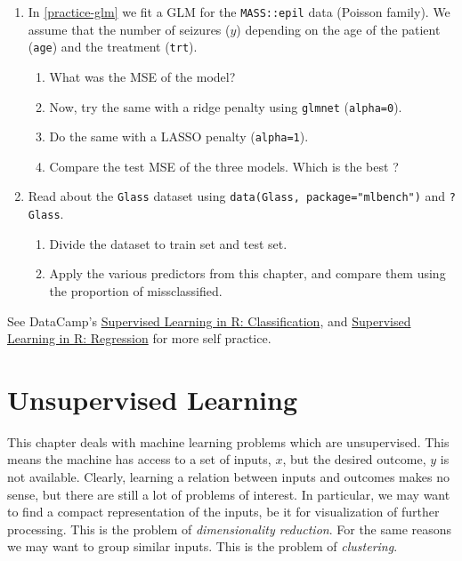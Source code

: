 \documentclass[]{book}
\providecommand{\tightlist}{%
  \setlength{\itemsep}{0pt}\setlength{\parskip}{0pt}}
\theoremstyle{definition}
\theoremstyle{definition}
\theoremstyle{definition}
\theoremstyle{remark}
\begin{document}
\begin{enumerate}
\def\labelenumi{\arabic{enumi}.}
\tightlist
\item
  In \ref{practice-glm} we fit a GLM for the \texttt{MASS::epil} data
  (Poisson family). We assume that the number of seizures (\(y\))
  depending on the age of the patient (\texttt{age}) and the treatment
  (\texttt{trt}).

  \begin{enumerate}
  \def\labelenumii{\arabic{enumii}.}
  \tightlist
  \item
    What was the MSE of the model?
  \item
    Now, try the same with a ridge penalty using \texttt{glmnet}
    (\texttt{alpha=0}).
  \item
    Do the same with a LASSO penalty (\texttt{alpha=1}).
  \item
    Compare the test MSE of the three models. Which is the best ?
  \end{enumerate}
\item
  Read about the \texttt{Glass} dataset using
  \texttt{data(Glass,\ package="mlbench")} and \texttt{?Glass}.

  \begin{enumerate}
  \def\labelenumii{\arabic{enumii}.}
  \tightlist
  \item
    Divide the dataset to train set and test set.
  \item
    Apply the various predictors from this chapter, and compare them
    using the proportion of missclassified.
  \end{enumerate}
\end{enumerate}

See DataCamp's
\href{https://www.datacamp.com/courses/supervised-learning-in-r-classification}{Supervised
Learning in R: Classification}, and
\href{https://www.datacamp.com/courses/supervised-learning-in-r-regression}{Supervised
Learning in R: Regression} for more self practice.

\chapter{Unsupervised Learning}\label{unsupervised}

This chapter deals with machine learning problems which are
unsupervised. This means the machine has access to a set of inputs,
\(x\), but the desired outcome, \(y\) is not available. Clearly,
learning a relation between inputs and outcomes makes no sense, but
there are still a lot of problems of interest. In particular, we may
want to find a compact representation of the inputs, be it for
visualization of further processing. This is the problem of
\emph{dimensionality reduction}. For the same reasons we may want to
group similar inputs. This is the problem of \emph{clustering}.
\end{document}
